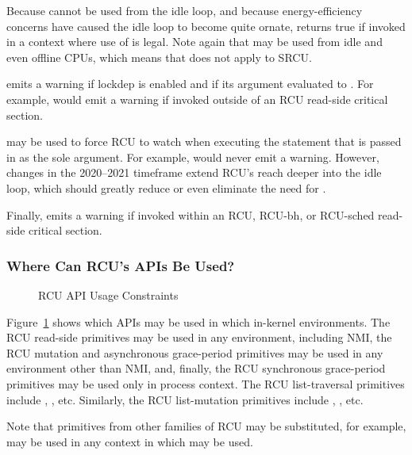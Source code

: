 Because  cannot be used from the idle loop,
and because energy-efficiency concerns have caused the idle loop
to become quite ornate,  returns true if
invoked in a context where use of  is legal.
Note again that  may be used from idle and
even offline CPUs, which means that  does not
apply to SRCU\@.

 emits a warning if lockdep is enabled and if
its argument evaluated to .
For example,  would emit a
warning if invoked outside of an RCU read-side critical section.

 may be used to force RCU to watch when executing
the statement that is passed in as the sole argument.
For example, 
would never emit a warning.
However, changes in the 2020--2021 timeframe extend RCU's reach deeper
into the idle loop, which should greatly reduce or even eliminate the
need for .

Finally,   emits a warning if invoked within
an RCU, RCU-bh, or RCU-sched read-side critical section.

\subsubsection{Where Can RCU's APIs Be Used?}
\label{sec:defer:Where Can RCU's APIs Be Used?}

\begin{figure}[tb]
\centering
{}
\caption{RCU API Usage Constraints}
\label{fig:defer:RCU API Usage Constraints}
\end{figure}

Figure~\ref{fig:defer:RCU API Usage Constraints}
shows which APIs may be used in which in-kernel environments.
The RCU read-side primitives may be used in any environment, including NMI,
the RCU mutation and asynchronous grace-period primitives may be used in any
environment other than NMI, and, finally, the RCU synchronous grace-period
primitives may be used only in process context.
The RCU list-traversal primitives include ,
, etc.
Similarly, the RCU list-mutation primitives include
, , etc.

Note that primitives from other families of RCU may be substituted,
for example,  may be used in any context
in which  may be used.

